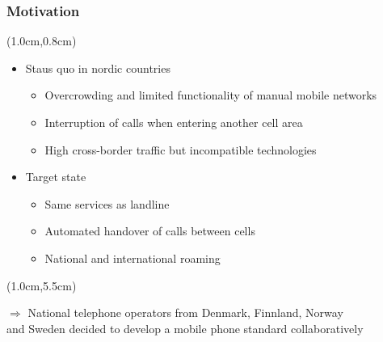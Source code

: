 \begin{frame}
  \frametitle{Motivation}
 \textblockorigin{0.0cm}{2.0cm}
 
 \begin{textblock*}{11cm}(1.0cm,0.8cm)
 \begin{itemize}
     \item Staus quo in nordic countries
     \begin{itemize}
      \item Overcrowding and limited functionality of manual mobile networks
      \item Interruption of calls when entering another cell area
      \item High cross-border traffic but incompatible technologies
     \end{itemize}
    \end{itemize}
 
 \vspace{0.5cm}
 
   \begin{itemize}
     \item Target state
      \begin{itemize}
	\item Same services as landline
        \item Automated handover of calls between cells
        \item National and international roaming
      \end{itemize}
    \end{itemize}
   \end{textblock*}
    
   \begin{textblock*}{11cm}(1.0cm,5.5cm)
   \begin{center}
     $\Rightarrow$ National telephone operators from Denmark, Finnland, Norway\\and Sweden decided to develop a mobile
phone standard collaboratively
    \end{center} 
   \end{textblock*}
   

\end{frame}
